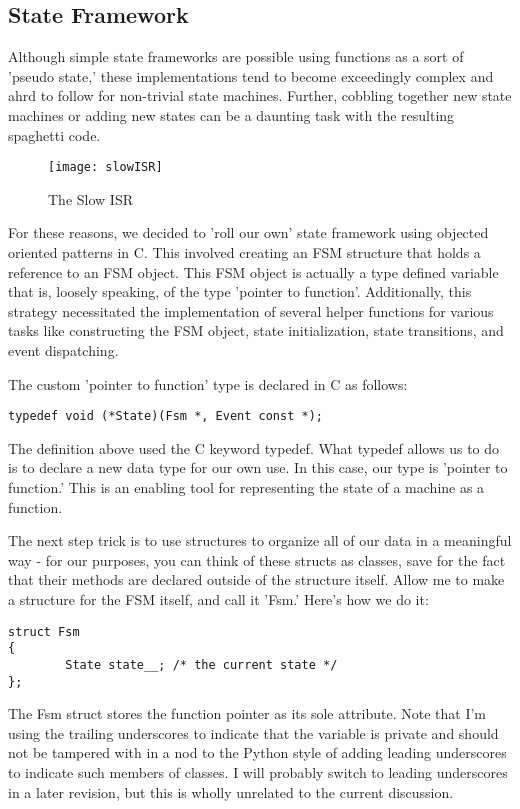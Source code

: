\subsection{State Framework}
Although simple state frameworks are possible using functions as a sort of 'pseudo state,' these implementations tend to become exceedingly complex and ahrd to follow for non-trivial state machines. Further, cobbling together new state machines or adding new states can be a daunting task with the resulting spaghetti code. 

\begin{figure}[h]
\begin{center}
\texttt{[image: slowISR]}
\caption{The Slow ISR}
\label{slow}
\end{center}
\end{figure}

For these reasons, we decided to 'roll our own' state framework using objected oriented patterns in C. This involved creating an FSM structure that holds a reference to an FSM object. This FSM object is actually a type defined variable that is, loosely speaking, of the type 'pointer to function'. Additionally, this strategy necessitated the implementation of several helper functions for various tasks like constructing the FSM object, state initialization, state transitions, and event dispatching. 

The custom 'pointer to function' type is declared in C as follows:
\begin{lstlisting}
typedef void (*State)(Fsm *, Event const *);
\end{lstlisting}

The definition above used the C keyword typedef. What typedef allows us to do is to declare a new data type for our own use. In this case, our type is 'pointer to function.' This is an enabling tool for representing the state of a machine as a function.

The next step trick is to use structures to organize all of our data in a meaningful way - for our purposes, you can think of these structs as classes, save for the fact that their methods are declared outside of the structure itself. Allow me to make a structure for the FSM itself, and call it 'Fsm.' Here's how we do it:

\begin{lstlisting}
struct Fsm
{      
        State state__; /* the current state */
};
\end{lstlisting}

The Fsm struct stores the function pointer as its sole attribute. Note that I'm using the trailing underscores to indicate that the variable is private and should not be tampered with in a nod to the Python style of adding leading underscores to indicate such members of classes. I will probably switch to leading underscores in a later revision, but this is wholly unrelated to the current discussion.

